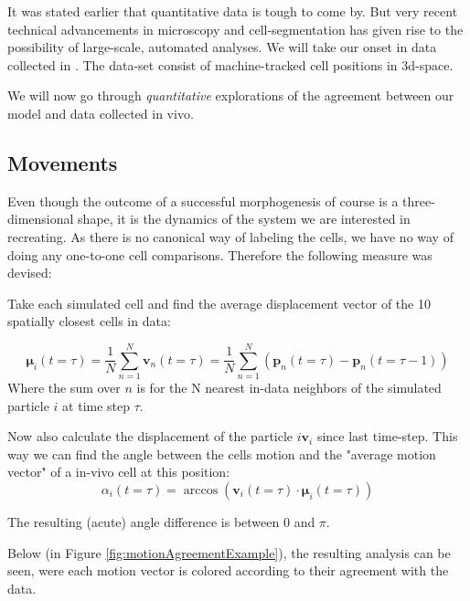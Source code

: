 It was stated earlier that quantitative data is tough to come by. But very recent technical advancements in microscopy and cell-segmentation has given rise to the possibility of large-scale, automated analyses.\cite{stern2022deconstructing} We will take our onset in data collected in . The data-set consist of machine-tracked cell positions in 3d-space.

We will now go through \textit{quantitative} explorations of the agreement between our model and data collected in vivo. 


\subsection{Movements}

Even though the outcome of a successful morphogenesis of course is a three-dimensional shape, it is the dynamics of the system we are interested in recreating. As there is no canonical way of labeling the cells, we have no way of doing any one-to-one cell comparisons. Therefore the following measure was devised: 

Take each simulated cell and find the average displacement vector of the 10 spatially closest cells in data:

\begin{equation}
    \boldsymbol{\mu}_i(t=\tau) = \frac{1}{N} \sum_{n=1}^{N}\boldsymbol{v}_n(t=\tau)= \frac{1}{N}\sum_{n=1}^{N}\left(\boldsymbol{p}_n(t=\tau) - \boldsymbol{p}_n(t=\tau-1) \right)
\end{equation}
Where the sum over $n$ is for the N nearest in-data neighbors of the simulated particle $i$ at time step $\tau$.

Now also calculate the displacement of the particle $i$$\boldsymbol{v}_i$ since last time-step. This way we can find the angle between the cells motion and the "average motion vector" of a in-vivo cell at this position:
\begin{equation}
    \alpha_i(t=\tau) = \arccos\left(\boldsymbol{v}_i(t=\tau)\cdot\boldsymbol{\mu}_i(t=\tau)\right)
\end{equation}

The resulting (acute) angle difference is between 0 and $\pi$. 

Below (in Figure  \ref{fig:motionAgreementExample}), the resulting analysis can be seen, were each motion vector is colored according to their agreement with the data.

